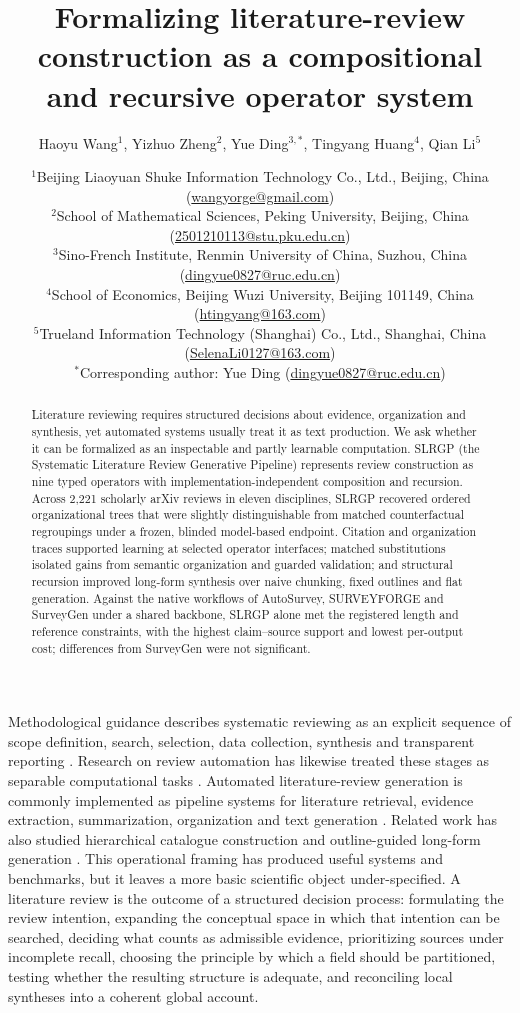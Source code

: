 \documentclass[11pt,a4paper]{article}
\title{Formalizing literature-review construction as a compositional and recursive operator system}
\author{%
Haoyu Wang$^{1}$,
Yizhuo Zheng$^{2}$,
Yue Ding$^{3,\ast}$,
Tingyang Huang$^{4}$,
Qian Li$^{5}$
}
\date{%
\normalsize
$^{1}$Beijing Liaoyuan Shuke Information Technology Co., Ltd., Beijing, China (\href{mailto:wangyorge@gmail.com}{wangyorge@gmail.com})\\
$^{2}$School of Mathematical Sciences, Peking University, Beijing, China (\href{mailto:2501210113@stu.pku.edu.cn}{2501210113@stu.pku.edu.cn})\\
$^{3}$Sino-French Institute, Renmin University of China, Suzhou, China (\href{mailto:dingyue0827@ruc.edu.cn}{dingyue0827@ruc.edu.cn})\\
$^{4}$School of Economics, Beijing Wuzi University, Beijing 101149, China (\href{mailto:htingyang@163.com}{htingyang@163.com})\\
$^{5}$Trueland Information Technology (Shanghai) Co., Ltd., Shanghai, China (\href{mailto:SelenaLi0127@163.com}{SelenaLi0127@163.com})\\[6pt]
$^{\ast}$Corresponding author: Yue Ding (\href{mailto:dingyue0827@ruc.edu.cn}{dingyue0827@ruc.edu.cn})
}
\begin{document}
\linenumbers

\maketitle

\begin{abstract}
Literature reviewing requires structured decisions about evidence, organization and synthesis, yet automated systems usually treat it as text production. We ask whether it can be formalized as an inspectable and partly learnable computation. SLRGP (the Systematic Literature Review Generative Pipeline) represents review construction as nine typed operators with implementation-independent composition and recursion. 
Across 2,221 scholarly arXiv reviews in eleven disciplines, SLRGP recovered ordered organizational trees that were slightly distinguishable from matched counterfactual regroupings under a frozen, blinded model-based endpoint. Citation and organization traces supported learning at selected operator interfaces; matched substitutions isolated gains from semantic organization and guarded validation; and structural recursion improved long-form synthesis over naive chunking, fixed outlines and flat generation. Against the native workflows of AutoSurvey, SURVEYFORGE and SurveyGen under a shared backbone, SLRGP alone met the registered length and reference constraints, with the highest claim--source support and lowest per-output cost; differences from SurveyGen were not significant.
\end{abstract}

Methodological guidance describes systematic reviewing as an explicit sequence of scope definition, search, selection, data collection, synthesis and transparent reporting \cite{prisma2020,cochrane2024}. Research on review automation has likewise treated these stages as separable computational tasks \cite{tsafnat2014,marshall2019,asreview}. Automated literature-review generation is commonly implemented as pipeline systems for literature retrieval, evidence extraction, summarization, organization and text generation \cite{autosurvey,surveyforge,surveyx,hireview,openscholar}. Related work has also studied hierarchical catalogue construction and outline-guided long-form generation \cite{hiercatalog,storm}. This operational framing has produced useful systems and benchmarks, but it leaves a more basic scientific object under-specified. A literature review is the outcome of a structured decision process: formulating the review intention, expanding the conceptual space in which that intention can be searched, deciding what counts as admissible evidence, prioritizing sources under incomplete recall, choosing the principle by which a field should be partitioned, testing whether the resulting structure is adequate, and reconciling local syntheses into a coherent global account.
\end{document}
